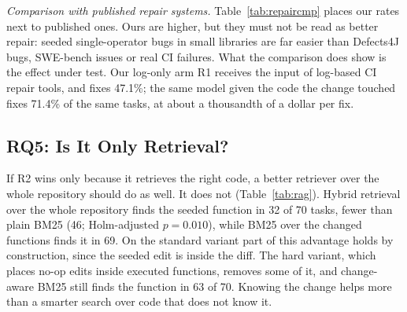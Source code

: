 \documentclass[10pt,conference]{IEEEtran}
\begin{document}
\textit{Comparison with published repair systems.} Table~\ref{tab:repaircmp} places our rates next to published ones. Ours are higher, but they must not be read as better repair: seeded single-operator bugs in small libraries are far easier than Defects4J bugs, SWE-bench issues or real CI failures. What the comparison does show is the effect under test. Our log-only arm R1 receives the input of log-based CI repair tools, and fixes 47.1\%; the same model given the code the change touched fixes 71.4\% of the same tasks, at about a thousandth of a dollar per fix.

\subsection{RQ5: Is It Only Retrieval?}
\label{sec:rq5}

\begin{table}[t]
\caption{RQ5: Seeded Function Among the Top 3 Retrieved Chunks (70 Tasks per Variant, No Model Involved)}
\label{tab:rag}
\centering
\scriptsize
\setlength{\tabcolsep}{3pt}
\end{table}

If R2 wins only because it retrieves the right code, a better retriever over the whole repository should do as well. It does not (Table~\ref{tab:rag}). Hybrid retrieval over the whole repository finds the seeded function in 32 of 70 tasks, fewer than plain BM25 (46; Holm-adjusted $p=0.010$), while BM25 over the changed functions finds it in 69. On the standard variant part of this advantage holds by construction, since the seeded edit is inside the diff. The hard variant, which places no-op edits inside executed functions, removes some of it, and change-aware BM25 still finds the function in 63 of 70. Knowing the change helps more than a smarter search over code that does not know it.
\end{document}
